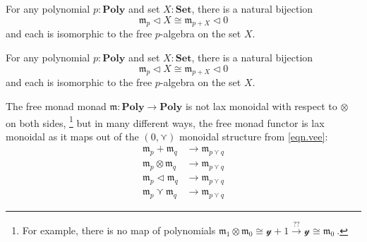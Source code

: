 \documentclass[11pt, one side, article]{memoir}
\theoremstyle{definition}
\theoremstyle{plain}
\newcommand{\Cat}[1]{\mathbf{#1}}%
\newcommand{\To}[2][]{\xrightarrow[#1]{#2}}
\newcommand{\smset}{\Cat{Set}}
\newcommand{\yon}{\mathcal{y}}
\newcommand{\poly}{\Cat{Poly}}
\newcommand{\0}{\textsf{0}}
\newcommand{\1}{\tn{\textsf{1}}}
\newcommand{\tri}{\mathbin{\triangleleft}}
\newcommand{\free}{\mathfrak{m}}
\begin{document}
For any polynomial $p:\poly$ and set $X:\smset$, there is a natural bijection
\begin{equation}
  \free_p\tri X
  \cong
	\free_{p+X}\tri 0  
\end{equation}
and each is isomorphic to the free $p$-algebra on the set $X$.

For any polynomial $p:\poly$ and set $X:\smset$, there is a natural bijection
\begin{equation}
  \free_p\tri X
  \cong
	\free_{p+X}\tri 0  
\end{equation}
and each is isomorphic to the free $p$-algebra on the set $X$.

The free monad monad $\free\colon\poly\to\poly$ is not lax monoidal with respect to $\otimes$ on both sides,%
\footnote{For example, there is no map of polynomials 
$
  \free_1\otimes\free_0\cong\yon+1
  \To{??}
  \yon\cong\free_0\
$.
}
but in many different ways, the free monad functor is lax monoidal as it maps out of the $(0,\curlyvee)$ monoidal structure from \eqref{eqn.vee}:
\begin{align}
\label{eqn.vee1}
	\free_p+\free_q&\to\free_{p\curlyvee q}\\
\label{eqn.vee2}
	\free_p\otimes\free_q&\to\free_{p\curlyvee q}\\
\label{eqn.vee3}
	\free_p\tri\free_q&\to\free_{p\curlyvee q}\\
\label{eqn.vee4}
	\free_p\curlyvee\free_q&\to\free_{p\curlyvee q}
\end{align}
\end{document}
